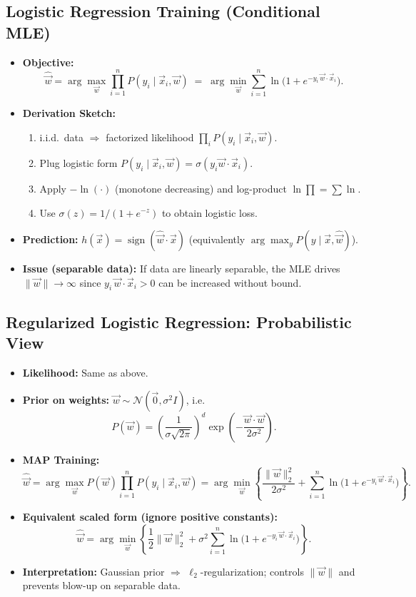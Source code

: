 \subsection{Logistic Regression Training (Conditional MLE)}
\begin{itemize}
    \item \textbf{Objective:}
    \[
      \hat{\vec{w}}=\arg\max_{\vec{w}} \prod_{i=1}^n P(y_i\mid \vec{x}_i,\vec{w})
      \;=\; \arg\min_{\vec{w}} \sum_{i=1}^n \ln\!\big(1+e^{-y_i\,\vec{w}\cdot\vec{x}_i}\big).
    \]
    \item \textbf{Derivation Sketch:}
    \begin{enumerate}
        \item i.i.d.\ data $\Rightarrow$ factorized likelihood $\prod_i P(y_i\mid \vec{x}_i,\vec{w})$.
        \item Plug logistic form $P(y_i\mid \vec{x}_i,\vec{w})=\sigma(y_i\vec{w}\!\cdot\!\vec{x}_i)$.
        \item Apply $-\ln(\cdot)$ (monotone decreasing) and log-product $\ln\prod=\sum\ln$.
        \item Use $\sigma(z)=1/(1+e^{-z})$ to obtain logistic loss.
    \end{enumerate}
    \item \textbf{Prediction:} $h(\vec{x})=\operatorname{sign}(\hat{\vec{w}}\cdot \vec{x})$ (equivalently $\arg\max_y P(y\mid \vec{x},\hat{\vec{w}})$).
    \item \textbf{Issue (separable data):} If data are linearly separable, the MLE drives $\|\vec{w}\|\to\infty$ since $y_i\,\vec{w}\!\cdot\!\vec{x}_i>0$ can be increased without bound.
\end{itemize}

\subsection{Regularized Logistic Regression: Probabilistic View}
\begin{itemize}
    \item \textbf{Likelihood:} Same as above.
    \item \textbf{Prior on weights:} $\vec{w}\sim \mathcal{N}(\vec{0},\sigma^2 I)$, i.e.
    \[
      P(\vec{w})=\left(\frac{1}{\sigma\sqrt{2\pi}}\right)^{\!d}
      \exp\!\left(-\frac{\vec{w}\cdot\vec{w}}{2\sigma^2}\right).
    \]
    \item \textbf{MAP Training:}
    \[
      \hat{\vec{w}}
      =\arg\max_{\vec{w}} P(\vec{w})\prod_{i=1}^n P(y_i\mid \vec{x}_i,\vec{w})
      =\arg\min_{\vec{w}}
      \left\{\frac{\|\vec{w}\|_2^2}{2\sigma^2}+\sum_{i=1}^n \ln\!\big(1+e^{-y_i\,\vec{w}\cdot\vec{x}_i}\big)\right\}.
    \]
    \item \textbf{Equivalent scaled form (ignore positive constants):}
    \[
      \hat{\vec{w}}=\arg\min_{\vec{w}}
      \left\{\frac{1}{2}\|\vec{w}\|_2^2+\sigma^{2}\sum_{i=1}^n \ln\!\big(1+e^{-y_i\,\vec{w}\cdot\vec{x}_i}\big)\right\}.
    \]
    \item \textbf{Interpretation:} Gaussian prior $\Rightarrow$ $\ell_2$-regularization; controls $\|\vec{w}\|$ and prevents blow-up on separable data.
\end{itemize}

